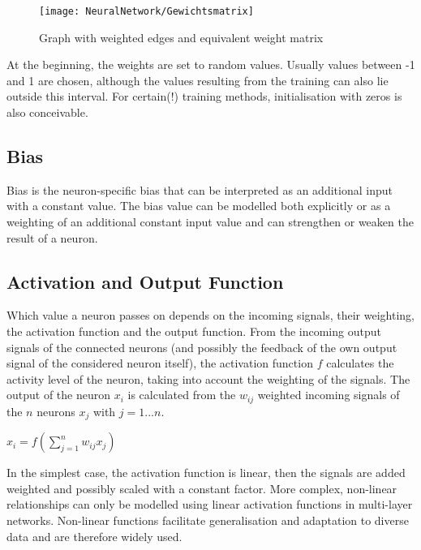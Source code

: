 \begin{figure}[H]
	\begin{center}
		\texttt{[image: NeuralNetwork/Gewichtsmatrix]}
		\caption{Graph with weighted edges and equivalent weight matrix} 
		\label{Gewichtsmatrix}
	\end{center}
\end{figure}

At the beginning, the weights are set to random values. Usually values between -1 and 1 are chosen, although the values resulting from the training can also lie outside this interval. \cite{Moeser:2018} For certain(!) training methods, initialisation with zeros is also conceivable. \cite{Kononenko:2007}

\subsection{Bias}

Bias is the neuron-specific bias that can be interpreted as an additional input with a constant value. The bias value can be modelled both explicitly or as a weighting of an additional constant input value and can strengthen or weaken the result of a neuron. \cite{Ziegler:2015}

\subsection{Activation and Output Function} \label{activation and output function} 

Which value a neuron passes on depends on the incoming signals, their weighting, the activation function and the output function. From the incoming output signals of the connected neurons (and possibly the feedback of the own output signal of the considered neuron itself), the activation function $f$ calculates the activity level of the neuron, taking into account the weighting of the signals. \cite{Kruse:2015} The output of the neuron $x_i$ is calculated from the $w_{ij}$ weighted incoming signals of the $n$ neurons $x_j$ with $j = 1...n$.

\begin{center}
$x_i = f(\sum \limits_{j=1}^n w_{ij} x_j)$
\end{center}

In the simplest case, the activation function is linear, then the signals are added weighted and possibly scaled with a constant factor. More complex, non-linear relationships can only be modelled using linear activation functions in multi-layer networks.\cite{Kononenko:2007} Non-linear functions facilitate generalisation and adaptation to diverse data and are therefore widely used. \cite{Gupta:2020b}

